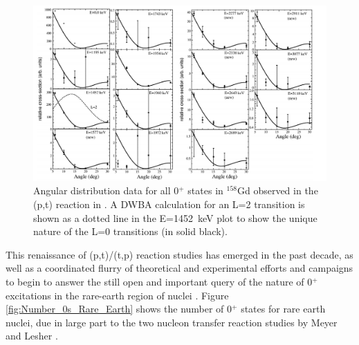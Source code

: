 \begin{figure}[ht]
\begin{center}
\includegraphics[width=\textwidth]{figures/158Gd(pt).png}
\caption{Angular distribution data for all 0$^+$ states in $^{158}$Gd observed in the (p,t) reaction in \cite{Meyer_pt0_2006}. A DWBA calculation for an L=2 transition is shown as a dotted line in the E=1452~keV plot to show the unique nature of the L=0 transitions (in solid black).}
\label{fig:158Gdpt}
\end{center}
\end{figure}

This renaissance of (p,t)/(t,p) reaction studies has emerged in the past decade, as well as a coordinated flurry of theoretical and experimental efforts and campaigns to begin to answer the still open and important query of the nature of 0$^+$ excitations in the rare-earth region of nuclei \cite{WuAprahamian_multiphonon_1994, Aprahamian2004, Borner_collective1999, Garrett_betavib2001,RevModPhys.83.1467, Bonatsos_collective02009, Clark_pairtransfer2009, Pietrella_beta_2004, Zamfir_doubleoctupole_2002, Sun_0plusnature_PSM_2003}. Figure \ref{fig:Number_0s_Rare_Earth} shows the number of 0$^+$ states for rare earth nuclei, due in large part to the two nucleon transfer reaction studies by Meyer and Lesher \cite{Lesher_158Gdpt,Meyer_pt0_2006}.

